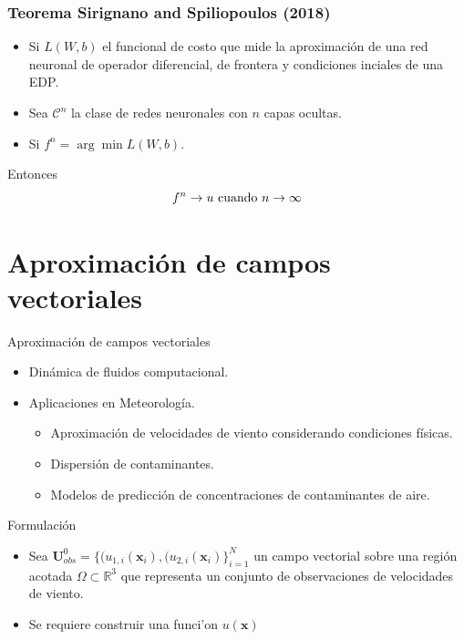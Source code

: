 \documentclass[aspectratio=1610]{beamer}
\begin{document}
\begin{frame}
  \frametitle{ Teorema Sirignano and Spiliopoulos (2018)}
  \begin{itemize}
  \item Si $L(W,b)$ el funcional de costo que mide la aproximaci\'on de una red neuronal  de operador diferencial, de frontera y condiciones inciales de una EDP.
  \item Sea $\mathcal{C}^n$ la clase de redes neuronales con $n$ capas ocultas.
  \item Si $f^n = \arg \min L(W,b)$. 
  \end{itemize}
Entonces
\begin{displaymath}
  f^n \to u \textnormal{ cuando } n \to \infty
\end{displaymath}

\end{frame}

\section{Aproximaci\'on de campos vectoriales }
\begin{frame}{Aproximaci\'on de campos vectoriales }
 
  \begin{itemize}
  \item Dinámica de fluidos computacional.
  \item Aplicaciones en Meteorología.
    \begin{itemize}
    \item Aproximaci\'on de velocidades de viento considerando condiciones f\'isicas.    
    \item Dispersi\'on de contaminantes.
    \item Modelos de predicci\'on de concentraciones de contaminantes de aire.  
    \end{itemize}
  \end{itemize}

\end{frame}



\begin{frame}{Formulaci\'on }
  \begin{itemize}
  \item   Sea $\mathbf{U}_{obs}^0 = \{ (u_{1,i}(\mathbf{x}_i),(u_{2,i}(\mathbf{x}_i) \}_{i=1}^N$ un campo vectorial sobre una región acotada $\Omega\subset \mathbb{R}^3$ que representa un conjunto de observaciones de velocidades de viento. 
  \item Se requiere construir una funci'on $u(\mathbf{x})$
  \end{itemize}

\end{frame}
\end{document}
